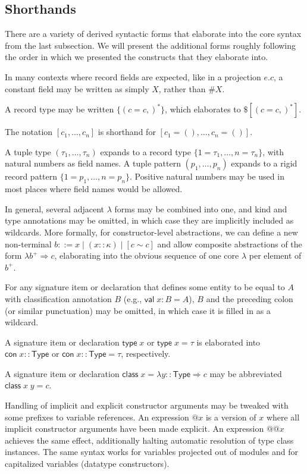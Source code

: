 \documentclass{article}
\newcommand{\mt}[1]{\mathsf{#1}}
\begin{document}
\subsection{Shorthands}

There are a variety of derived syntactic forms that elaborate into the core syntax from the last subsection.  We will present the additional forms roughly following the order in which we presented the constructs that they elaborate into.

In many contexts where record fields are expected, like in a projection $e.c$, a constant field may be written as simply $X$, rather than $\#X$.

A record type may be written $\{(c = c,)^*\}$, which elaborates to $\$[(c = c,)^*]$.

The notation $[c_1, \ldots, c_n]$ is shorthand for $[c_1 = (), \ldots, c_n = ()]$.

A tuple type $(\tau_1, \ldots, \tau_n)$ expands to a record type $\{1 = \tau_1, \ldots, n = \tau_n\}$, with natural numbers as field names.  A tuple pattern $(p_1, \ldots, p_n)$ expands to a rigid record pattern $\{1 = p_1, \ldots, n = p_n\}$.  Positive natural numbers may be used in most places where field names would be allowed.

In general, several adjacent $\lambda$ forms may be combined into one, and kind and type annotations may be omitted, in which case they are implicitly included as wildcards.  More formally, for constructor-level abstractions, we can define a new non-terminal $b ::= x \mid (x :: \kappa) \mid [c \sim c]$ and allow composite abstractions of the form $\lambda b^+ \Rightarrow c$, elaborating into the obvious sequence of one core $\lambda$ per element of $b^+$.  

For any signature item or declaration that defines some entity to be equal to $A$ with classification annotation $B$ (e.g., $\mt{val} \; x : B = A$), $B$ and the preceding colon (or similar punctuation) may be omitted, in which case it is filled in as a wildcard.

A signature item or declaration $\mt{type} \; x$ or $\mt{type} \; x = \tau$ is elaborated into $\mt{con} \; x :: \mt{Type}$ or $\mt{con} \; x :: \mt{Type} = \tau$, respectively.

A signature item or declaration $\mt{class} \; x = \lambda y :: \mt{Type} \Rightarrow c$ may be abbreviated $\mt{class} \; x \; y = c$.

Handling of implicit and explicit constructor arguments may be tweaked with some prefixes to variable references.  An expression $@x$ is a version of $x$ where all implicit constructor arguments have been made explicit.  An expression $@@x$ achieves the same effect, additionally halting automatic resolution of type class instances.  The same syntax works for variables projected out of modules and for capitalized variables (datatype constructors).
\end{document}

